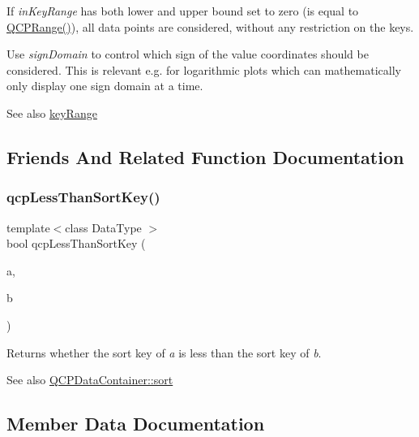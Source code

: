 If {\itshape in\+Key\+Range} has both lower and upper bound set to zero (is equal to {\ttfamily \mbox{\hyperlink{class_q_c_p_range}{Q\+C\+P\+Range()}}}), all data points are considered, without any restriction on the keys.

Use {\itshape sign\+Domain} to control which sign of the value coordinates should be considered. This is relevant e.\+g. for logarithmic plots which can mathematically only display one sign domain at a time.

\begin{DoxySeeAlso}{See also}
\mbox{\hyperlink{class_q_c_p_data_container_aba6e1a93c21ccc56a432b4a02c9d0ed2}{key\+Range}} 
\end{DoxySeeAlso}


\subsection{Friends And Related Function Documentation}
\mbox{\label{class_q_c_p_data_container_a74c5e06728cb6fa778a25d9ec0c4bd36}} 
\subsubsection{\texorpdfstring{qcpLessThanSortKey()}{qcpLessThanSortKey()}}
{\footnotesize\ttfamily template$<$class Data\+Type $>$ \\
bool qcp\+Less\+Than\+Sort\+Key (\begin{DoxyParamCaption}\item[{const Data\+Type \&}]{a,  }\item[{const Data\+Type \&}]{b }\end{DoxyParamCaption})\hspace{0.3cm}{\ttfamily [related]}}

Returns whether the sort key of {\itshape a} is less than the sort key of {\itshape b}.

\begin{DoxySeeAlso}{See also}
\mbox{\hyperlink{class_q_c_p_data_container_a75da92e33063b63d6da5014683591d45}{Q\+C\+P\+Data\+Container\+::sort}} 
\end{DoxySeeAlso}


\subsection{Member Data Documentation}
\mbox{\label{class_q_c_p_data_container_aae64c517d64511ad7a81ff8ee7b29147}} 
